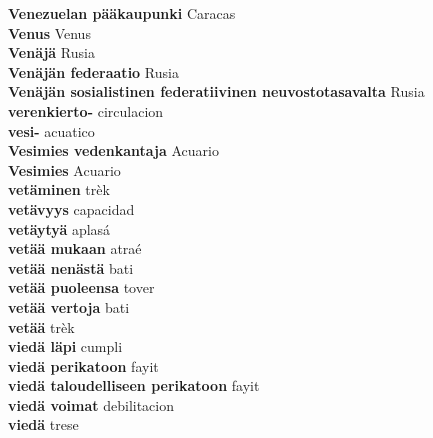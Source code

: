 \textbf{ Venezuelan pääkaupunki  } Caracas \\
\textbf{ Venus  } Venus \\
\textbf{ Venäjä  } Rusia \\
\textbf{ Venäjän federaatio  } Rusia \\
\textbf{ Venäjän sosialistinen federatiivinen neuvostotasavalta  } Rusia \\
\textbf{ verenkierto-  } circulacion \\
\textbf{ vesi-  } acuatico \\
\textbf{ Vesimies vedenkantaja  } Acuario \\
\textbf{ Vesimies  } Acuario \\
\textbf{ vetäminen  } trèk \\
\textbf{ vetävyys  } capacidad \\
\textbf{ vetäytyä  } aplasá \\
\textbf{ vetää mukaan  } atraé \\
\textbf{ vetää nenästä  } bati \\
\textbf{ vetää puoleensa  } tover \\
\textbf{ vetää vertoja  } bati \\
\textbf{ vetää  } trèk \\
\textbf{ viedä läpi  } cumpli \\
\textbf{ viedä perikatoon  } fayit \\
\textbf{ viedä taloudelliseen perikatoon  } fayit \\
\textbf{ viedä voimat  } debilitacion \\
\textbf{ viedä  } trese \\
